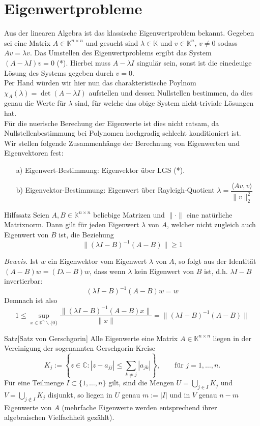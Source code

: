 \documentclass{article}
\begin{document}
    \section{Eigenwertprobleme}
    Aus der linearen Algebra ist das klassische Eigenwertproblem bekannt. Gegeben sei eine Matrix 
    $A\in\mathbb{K}^{n\times n}$ und gesucht sind $\lambda\in\mathbb{K}$ und $v\in\mathbb{K}^n$, $v\neq 0$ 
    sodass $Av=\lambda v$. Das Umstellen des Eigenwertproblems ergibt das System $(A-\lambda I)v=0$ (*). Hierbei muss 
    $A-\lambda I$ singulär sein, sonst ist die einedeuige Lösung des Systems gegeben durch $v=0$.\\
    Per Hand würden wir hier nun das charakteristische Poylnom $\chi_A(\lambda)=\det(A-\lambda I)$ aufstellen und 
    dessen Nullstellen bestimmen, da dies genau die Werte für $\lambda$ sind, für welche das obige System nicht-triviale
    Lösungen hat. \\
    Für die nuerische Berechung der Eigenwerte ist dies nicht ratsam, da Nullstellenbestimmung bei Polynomen 
    hochgradig schlecht konditioniert ist. \\
    Wir stellen folgende Zusammenhänge der Berechnung von Eigenwerten und Eigenvektoren fest:
    \begin{enumerate}
        \item[a)] Eigenwert-Bestimmung: Eigenvektor über LGS (*).
        \item[b)] Eigenvektor-Bestimmung: 
            Eigenwert über Rayleigh-Quotient $\lambda=\dfrac{\langle Av,v\rangle}{\|v\|_2^2}$ 
    \end{enumerate}
    \begin{thmbox}{Hilfssatz}
        Seien $A,B\in\mathbb{K}^{n\times n}$ beliebige Matrizen und $\|\cdot\|$ eine natürliche Matrixnorm. Dann gilt 
        für jeden Eigenwert $\lambda$ von $A$, welcher nicht zugleich auch Eigenwert von $B$ ist, die Beziehung
        \[\|(\lambda I-B)^{-1}(A-B)\|\geq 1\]
    \end{thmbox}
    \textit{Beweis.} Ist $w$ ein Eigenwektor vom Eigenwert $\lambda$ von $A$, so folgt aus der Identität 
    $(A-B)w = (I\lambda - B)w$, dass wenn $\lambda$ kein Eigenwert von $B$ ist, d.h. $\lambda I-B$ invertierbar: 
    \[(\lambda I-B)^{-1}(A-B)w=w\]
    Demnach ist also 
    \[1\leq \sup_{x\in\mathbb{K}^n\backslash\{0\}} \dfrac{\|(\lambda I-B)^{-1}(A-B)x\|}{\|x\|}
    =\|(\lambda I-B)^{-1}(A-B)\|\]
    \begin{thmbox}{Satz}[Satz von Gerschgorin]
        Alle Eigenwerte eine Matrix $A\in\mathbb{K}^{n\times n}$ liegen in der Vereinigung der sogenannten 
        Gerschgorin-Kreise
        \[K_j := \left\{z\in\mathbb{C} : |z-a_{jj}|\leq \sum_{k\neq j} |a_{jk}|\right\},
        \qquad \text{für } j=1,\dotsc,n.\]
        Für eine Teilmenge $I\subset\{1,\dotsc,n\}$ gilt, sind die Mengen $U=\displaystyle \bigcup_{j\in I} K_j$ 
        und $V=\displaystyle \bigcup_{j\notin I} K_j$ disjunkt, so liegen in $U$ genau $m:=|I|$ und in $V$ genau $n-m$ 
        Eigenwerte von $A$ (mehrfache Eigenwerte werden entsprechend ihrer algebraischen Vielfachheit gezählt).
    \end{thmbox}
\end{document}
